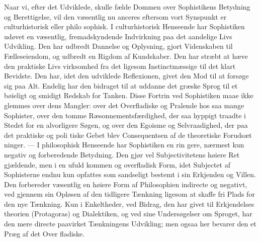 \documentclass[12pt,a4paper]{book}
\begin{document}
Naar vi, efter det Udviklede, skulle fælde Dommen over
Sophistikens Betydning og Berettigelse, vil den væsentlig nu\-%
anceres eftersom vort Synspunkt er culturhistorisk eller philo\-%
sophisk. I culturhistorisk Henseende har Sophistiken udøvet
en væsentlig, fremadskyndende Indvirkning paa det aandelige
Livs Udvikling. Den har udbredt Dannelse og Oplysning, gjort
Videnskaben til Fælleseiendom, og udbredt en Rigdom af
Kundskaber. Den har stræbt at hæve den praktiske Livs\-%
virksomhed fra det ligesom Instinctmæssige til det klart
Bevidste. Den har, idet den udviklede Reflexionen, givet den
Mod til at forsøge sig paa Alt. Endelig har den bidraget til at
uddanne det græske Sprog til et bøieligt og smidigt Redskab
for Tanken. Disse Fortrin ved Sophistiken maae ikke glemmes
over dens Mangler: over det Overfladiske og Pralende hos saa
mange Sophister, over den tomme Ræsonnementsfærdighed, der
saa hyppigt traadte i Stedet for en alvorligere Søgen, og over
den Egoisme og Selvraadighed, der paa det praktiske og poli\-%
tiske Gebet blev Consequentsen af de theoretiske Forudsæt\-%
ninger. --- I philosophisk Henseende har Sophistiken en rin\-%
gere, nærmest kun negativ og forberedende Betydning. Den
gjør vel Subjectivitetens høiere Ret gjældende, men i en ufuld\-%
kommen og overfladisk Form, idet Subjectet af Sophisterne
endnu kun opfattes som sandseligt bestemt i sin Erkjenden og
Villen. Den forbereder væsentlig en høiere Form af Philosophien
indirecte og negativt, ved gjennem sin Opløsen af den tidligere
Tænkning ligesom at skaffe fri Plads for den nye Tænkning.
Kun i Enkeltheder, ved Bidrag, den har givet til Erkjendelses\-%
theorien (Protagoras) og Dialektiken, og ved sine Undersøgelser
om Sproget, har den mere directe paavirket Tænkningens
Udvikling; men ogsaa her bevarer den et Præg af det Over\-%
fladiske.
\end{document}
